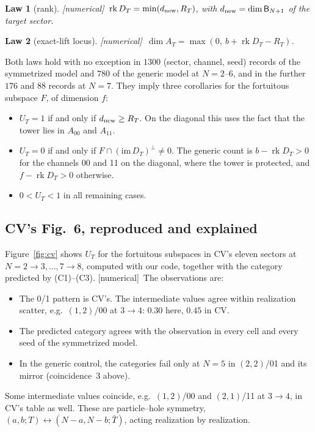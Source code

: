 \documentclass[11pt]{article}
\newcommand{\rk}{\operatorname{rk}}
\newcommand{\B}{\mathsf B}
\newcommand{\dnew}{d_{\rm new}}
\newcommand{\tagbox}[2]{\textsf{\small\color{#1}[#2]}}
\newcommand{\NUM}{\tagbox{cnum}{numerical}}
\theoremstyle{plain}
\newtheorem{law}{Law}
\theoremstyle{remark}
\numberwithin{equation}{section}
\begin{document}
\begin{law}[rank]\label{law:L1}\NUM\ $\rk D_T=\min(\dnew,R_T)$, with $\dnew=\dim\B_{N+1}$ of the target sector.\end{law}
\begin{law}[exact-lift locus]\label{law:L2}\NUM\ $\dim A_T=\max(0,\ b+\rk D_T-R_T)$.\end{law}
Both laws hold with no exception in $1300$ (sector, channel, seed) records of the symmetrized model and $780$ of the
generic model at $N=2$--$6$, and in the further $176$ and $88$ records at $N=7$. They imply three corollaries for the fortuitous subspace
$F$, of dimension $f$:
\begin{itemize}\itemsep2pt
\item[(C1)] $U_T=1$ if and only if $\dnew\ge R_T$. On the diagonal this uses the fact that the tower lies in $A_{00}$ and
  $A_{11}$.
\item[(C2)] $U_T=0$ if and only if $F\cap(\mathrm{im}\,D_T)^\perp\ne0$. The generic count is
  $b-\rk D_T>0$ for the channels 00 and 11 on the diagonal, where the tower is protected, and $f-\rk D_T>0$ otherwise.
\item[(C3)] $0<U_T<1$ in all remaining cases.
\end{itemize}

\subsection{CV's Fig.~6, reproduced and explained}

Figure~\ref{fig:cv} shows $U_T$ for the fortuitous subspaces in CV's eleven sectors at $N=2\to3,\dots,7\to8$, computed with
our code, together with the category predicted by (C1)--(C3). \NUM\ The observations are:
\begin{itemize}\itemsep2pt
\item The 0/1 pattern is CV's. The intermediate values agree within realization scatter, e.g.\ $(1,2)$/00 at
  $3\to4$: $0.30$ here, $0.45$ in CV.
\item The predicted category agrees with the observation in every cell and every seed of the symmetrized model.
\item In the generic control, the categories fail only at $N=5$ in $(2,2)$/01 and its mirror (coincidence~3 above).
\end{itemize}
Some intermediate values coincide, e.g.\ $(1,2)$/00 and $(2,1)$/11 at $3\to4$, in CV's table as well. These are
particle--hole symmetry, $(a,b;T)\leftrightarrow(N-a,N-b;\bar T)$, acting realization by realization.
\end{document}
